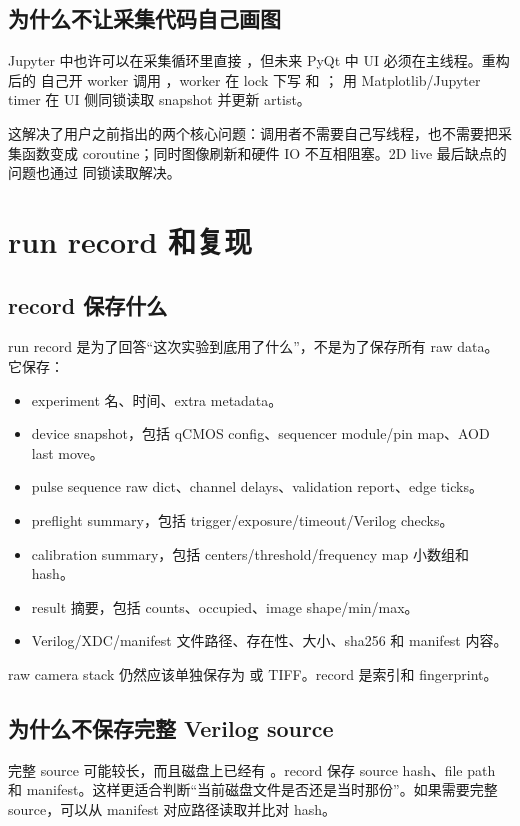 \documentclass[11pt,oneside,openany]{book}
\begin{document}
\section{为什么不让采集代码自己画图}
Jupyter 中也许可以在采集循环里直接 ，但未来 PyQt 中 UI 必须在主线程。重构后的  自己开 worker 调用 ，worker 在 lock 下写  和 ； 用 Matplotlib/Jupyter timer 在 UI 侧同锁读取 snapshot 并更新 artist。

这解决了用户之前指出的两个核心问题：调用者不需要自己写线程，也不需要把采集函数变成 coroutine；同时图像刷新和硬件 IO 不互相阻塞。2D live 最后缺点的问题也通过  同锁读取解决。

\chapter{run record 和复现}
\section{record 保存什么}
run record 是为了回答“这次实验到底用了什么”，不是为了保存所有 raw data。它保存：
\begin{itemize}
  \item experiment 名、时间、extra metadata。
  \item device snapshot，包括 qCMOS config、sequencer module/pin map、AOD last move。
  \item pulse sequence raw dict、channel delays、validation report、edge ticks。
  \item preflight summary，包括 trigger/exposure/timeout/Verilog checks。
  \item calibration summary，包括 centers/threshold/frequency map 小数组和 hash。
  \item result 摘要，包括 counts、occupied、image shape/min/max。
  \item Verilog/XDC/manifest 文件路径、存在性、大小、sha256 和 manifest 内容。
\end{itemize}
raw camera stack 仍然应该单独保存为  或 TIFF。record 是索引和 fingerprint。

\section{为什么不保存完整 Verilog source}
完整 source 可能较长，而且磁盘上已经有 。record 保存 source hash、file path 和 manifest。这样更适合判断“当前磁盘文件是否还是当时那份”。如果需要完整 source，可以从 manifest 对应路径读取并比对 hash。
\end{document}
